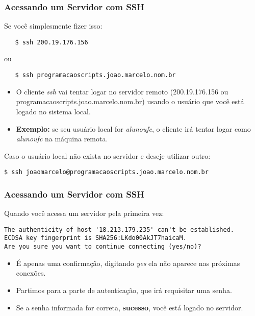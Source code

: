 \documentclass{beamer}
\begin{document}
\begin{frame}[fragile]
   \frametitle{Acessando um Servidor com SSH}
   Se você simplesmente fizer isso:
   \begin{verbatim}
   $ ssh 200.19.176.156
   \end{verbatim}
   ou
   \begin{verbatim}
   $ ssh programacaoscripts.joao.marcelo.nom.br
   \end{verbatim}
   \begin{itemize}
      \item O cliente \textit{ssh} vai tentar logar no servidor remoto (200.19.176.156 ou programacaoscripts.joao.marcelo.nom.br) usando o usuário que você está logado no sistema local.
      \item \textbf{Exemplo:} se seu usuário local for \textit{alunoufc}, o cliente irá tentar logar como \textit{alunoufc} na máquina remota.
   \end{itemize}

   Caso o usuário local não exista no servidor e deseje utilizar outro:
   \begin{verbatim}
$ ssh joaomarcelo@programacaoscripts.joao.marcelo.nom.br
   \end{verbatim}
\end{frame}

\begin{frame}[fragile]
   \frametitle{Acessando um Servidor com SSH}
   Quando você acessa um servidor pela primeira vez:
   \small
   \begin{verbatim}
The authenticity of host '18.213.179.235' can't be established.
ECDSA key fingerprint is SHA256:LKdo00AkJT7haicaM.
Are you sure you want to continue connecting (yes/no)?    
   \end{verbatim}
   \normalsize
   \begin{itemize}
      \item É apenas uma confirmação, digitando \textit{yes} ela não aparece nas próximas conexões.
      \item Partimos para a parte de autenticação, que irá requisitar uma senha.
      \item Se a senha informada for correta, \textbf{sucesso}, você está logado no servidor.
   \end{itemize}
\end{frame}
\end{document}
